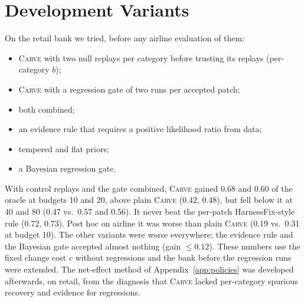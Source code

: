\documentclass[11pt]{article}
\newcommand{\carve}{\textsc{Carve}}
\begin{document}
\begin{table}[h]
\centering
\small
{}
\caption{Leave-one-out on the attributed set: success of the whole set minus the set without the named patch.}
\label{tab:abloo}
\end{table}

\begin{table}[h]
\centering
\small
{}
\caption{Clean held-out episodes: 38 old (Table~\ref{tab:deploy}) and 120 new (40 tasks $\times$ 3), where new episode $e$ uses the policy's seed-$(e \bmod 5)$ set. Differences pool both, paired by episode or slot and clustered by task.}
\label{tab:ablclean}
\end{table}

\section{Development Variants}
\label{app:dev}

On the retail bank we tried, before any airline evaluation of them:
\begin{itemize}
\setlength\itemsep{0pt}
\item \carve{} with two null replays per category before trusting its replays (per-category $b$);
\item \carve{} with a regression gate of two runs per accepted patch;
\item both combined;
\item an evidence rule that requires a positive likelihood ratio from data;
\item tempered and flat priors;
\item a Bayesian regression gate.
\end{itemize}
With control replays and the gate combined, \carve{} gained 0.68 and 0.60 of the oracle at budgets 10 and 20, above plain \carve{} (0.42, 0.48), but fell below it at 40 and 80 (0.47 vs.\ 0.57 and 0.56). It never beat the per-patch HarnessFix-style rule (0.72, 0.73). Post hoc on airline it was worse than plain \carve{} (0.19 vs.\ 0.31 at budget 10). The other variants were worse everywhere; the evidence rule and the Bayesian gate accepted almost nothing (gain $\le0.12$). These numbers use the fixed change cost $c$ without regressions and the bank before the regression runs were extended. The net-effect method of Appendix~\ref{app:policies} was developed afterwards, on retail, from the diagnosis that \carve{} lacked per-category spurious recovery and evidence for regressions.
\end{document}
